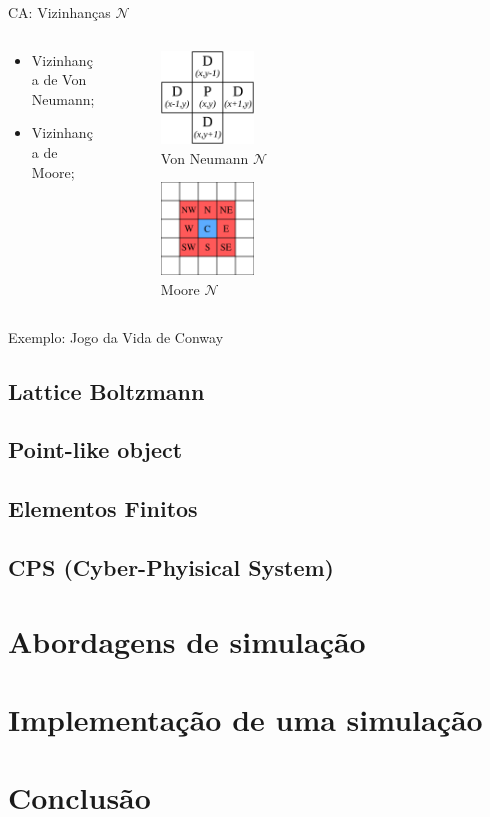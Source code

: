 \documentclass{beamer}
\begin{document}
		\begin{frame}{CA: Vizinhanças $\mathcal{N}$}
			\begin{columns}
				\begin{column}{0.5\textwidth}
					\begin{itemize}
						\item Vizinhança de Von Neumann;
						\item Vizinhança de Moore;
					\end{itemize}
				\end{column}
				\begin{column}{0.5\textwidth}
					\begin{figure}
						\includegraphics[width=0.3\textwidth]{neumann.png}
						\caption{Von Neumann $\mathcal{N}$}
					\end{figure}
				\begin{figure}
					\includegraphics[width=0.3\textwidth]{moore.png}
					\caption{Moore $\mathcal{N}$}
				\end{figure}							
				\end{column}
			\end{columns}
		\end{frame}
		\begin{frame}{Exemplo: Jogo da Vida de Conway}
			
		\end{frame}
			
		\subsection{Lattice Boltzmann}
		\subsection{Point-like object}
		\subsection{Elementos Finitos}
		\subsection{CPS (Cyber-Phyisical System)}		
	\section{Abordagens de simulação}
	\section{Implementação de uma simulação}
	\section{Conclusão}
\end{document}
